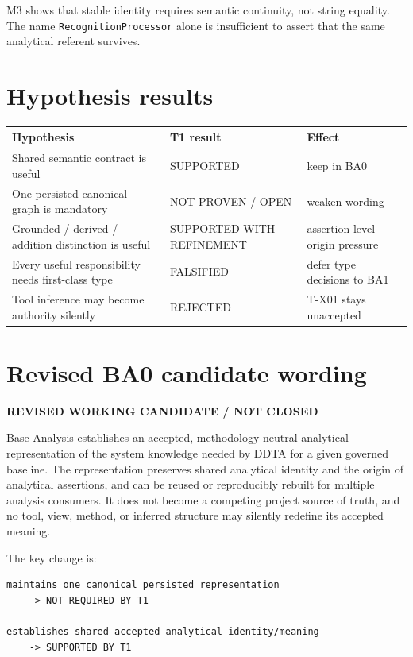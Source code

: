 \documentclass[10pt,a4paper]{article}
\newenvironment{trialbox}[1]{\def\FrameCommand{\fcolorbox{ddtaorange}{ddtagray}}\MakeFramed{\advance\hsize-2\width\FrameRestore}\noindent\textbf{#1}\par\smallskip}{\endMakeFramed}
\begin{document}
M3 shows that stable identity requires semantic continuity, not string equality. The name \texttt{RecognitionProcessor} alone is insufficient to assert that the same analytical referent survives.

\section{Hypothesis results}
\begin{longtable}{p{}p{}p{}}
\toprule\textbf{Hypothesis} & \textbf{T1 result} & \textbf{Effect}\\\midrule\endhead
Shared semantic contract is useful & SUPPORTED & keep in BA0\\
One persisted canonical graph is mandatory & NOT PROVEN / OPEN & weaken wording\\
Grounded / derived / addition distinction is useful & SUPPORTED WITH REFINEMENT & assertion-level origin pressure\\
Every useful responsibility needs first-class type & FALSIFIED & defer type decisions to BA1\\
Tool inference may become authority silently & REJECTED & T-X01 stays unaccepted\\
\bottomrule
\end{longtable}

\section{Revised BA0 candidate wording}
\begin{trialbox}{REVISED WORKING CANDIDATE / NOT CLOSED}
Base Analysis establishes an accepted, methodology-neutral analytical representation of the system knowledge needed by DDTA for a given governed baseline. The representation preserves shared analytical identity and the origin of analytical assertions, and can be reused or reproducibly rebuilt for multiple analysis consumers. It does not become a competing project source of truth, and no tool, view, method, or inferred structure may silently redefine its accepted meaning.
\end{trialbox}

The key change is:
\begin{lstlisting}
maintains one canonical persisted representation
    -> NOT REQUIRED BY T1

establishes shared accepted analytical identity/meaning
    -> SUPPORTED BY T1
\end{lstlisting}
\end{document}
